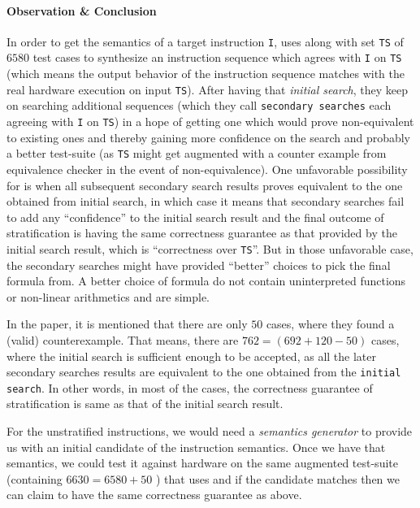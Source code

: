 \paragraph{Observation \& Conclusion}
     In order to get the semantics of a target instruction {\tt I}, \Strata uses \Stoke along with set {\tt TS} of $6580$ test cases to synthesize an instruction sequence which agrees with {\tt I} on {\tt TS} (which means the output behavior of the instruction sequence matches with the real hardware execution on input {\tt TS}). After having that \emph{initial search}, they keep on searching  additional sequences (which they call {\tt secondary searches} each agreeing with {\tt I} on {\tt TS}) in a hope of getting  one which would prove non-equivalent to existing ones and thereby gaining more confidence on the search and probably a better test-suite (as {\tt TS} might get augmented with a counter example from equivalence checker in the event of non-equivalence). One unfavorable possibility for \Strata is when all subsequent secondary search results proves  equivalent to the one obtained from initial search, in which case it  means that  secondary searches fail to add any ``confidence'' to the initial search result and the final outcome of stratification is having the same correctness guarantee as that provided by the initial search result, which is ``correctness over {\tt TS}''. But in those unfavorable case, the secondary searches might have provided ``better'' choices to pick the final formula from. A better choice of formula do not contain uninterpreted functions or  non-linear arithmetics  and are simple.  
    
   In the paper\cite{Heule2016a}, it is mentioned that there are only $50$ cases, where they found a (valid) counterexample. That means, there are $762 = (692 + 120 - 50)$ cases, where the initial search is sufficient enough to be accepted, as all the later secondary searches results are equivalent to the one obtained from the {\tt initial search}. In other words, in  most of the cases, the correctness guarantee of stratification is same as that of the initial search result. 
   
   For the unstratified instructions, we would need a \emph{semantics generator} to provide us with an initial candidate of the instruction semantics. Once we have that semantics, we could test it against hardware on the same augmented test-suite (containing $6630 = 6580 + 50$ ) that \Stoke uses and if the candidate  matches then we can claim to have the same correctness guarantee as above. 
   
